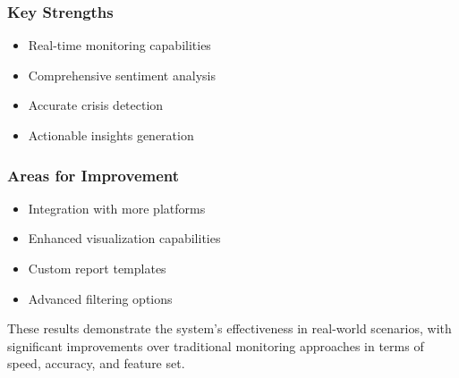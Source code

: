 \subsubsection{Key Strengths}
\begin{itemize}
    \item Real-time monitoring capabilities
    \item Comprehensive sentiment analysis
    \item Accurate crisis detection
    \item Actionable insights generation
\end{itemize}

\subsubsection{Areas for Improvement}
\begin{itemize}
    \item Integration with more platforms
    \item Enhanced visualization capabilities
    \item Custom report templates
    \item Advanced filtering options
\end{itemize}

These results demonstrate the system's effectiveness in real-world scenarios, with significant improvements over traditional monitoring approaches in terms of speed, accuracy, and feature set. 